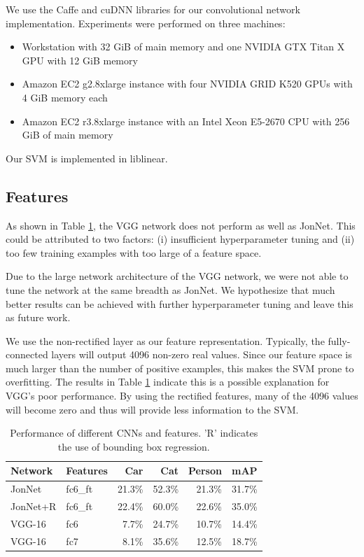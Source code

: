 \documentclass[10pt,twocolumn,letterpaper]{article}
\begin{document}
We use the Caffe \cite{jia2014caffe} and cuDNN \cite{chetlur2014cudnn} libraries for our convolutional network implementation. Experiments were performed on three machines:
\begin{itemize}
\setlength\itemsep{0em}
\item Workstation with 32 GiB of main memory and one NVIDIA GTX Titan X GPU with 12 GiB memory
\item Amazon EC2 g2.8xlarge instance with four NVIDIA GRID K520 GPUs with 4 GiB memory each
\item Amazon EC2 r3.8xlarge instance with an Intel Xeon E5-2670 CPU with 256 GiB of main memory
\end{itemize}
Our SVM \cite{scikit-learn} is implemented in liblinear.

\subsection{Features}

As shown in Table \ref{table:features}, the VGG network does not perform as well as JonNet. This could be attributed to two factors: (i) insufficient hyperparameter tuning and (ii) too few training examples with too large of a feature space.

Due to the large network architecture of the VGG network, we were not able to tune the network at the same breadth as JonNet. We hypothesize that much better results can be achieved with further hyperparameter tuning and leave this as future work.

We use the non-rectified layer as our feature representation.  Typically, the fully-connected layers will output 4096 non-zero real values. Since our feature space is much larger than the number of positive examples, this makes the SVM prone to overfitting. The results in Table \ref{table:features} indicate this is a possible explanation for VGG's poor performance. By using the rectified features, many of the 4096 values will become zero and thus will provide less information to the SVM. 

\begin{table}[h]
\centering
\begin{tabular}{llrrrr}
\hline
Network & Features & Car & Cat & Person & mAP \\ \hline
JonNet & fc6\_ft & 21.3\% & 52.3\% & 21.3\% & 31.7\% \\
JonNet+R & fc6\_ft & 22.4\% & 60.0\% & 22.6\% & 35.0\% \\
VGG-16 & fc6 & 7.7\% & 24.7\% & 10.7\% & 14.4\% \\
VGG-16 & fc7 & 8.1\% & 35.6\% & 12.5\% & 18.7\% \\ \hline
\end{tabular}
\caption{Performance of different CNNs and features. 'R' indicates the use of bounding box regression.}
\label{table:features}
\end{table}
\end{document}
